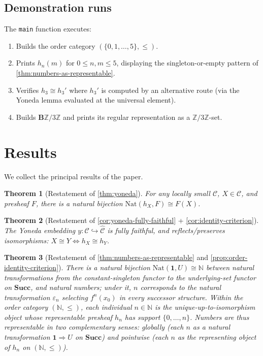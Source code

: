 \documentclass[12pt]{article}
\newtheorem{theorem}{Theorem}[section]
\theoremstyle{definition}
\theoremstyle{remark}
\begin{document}
\subsection{Demonstration runs}

The \texttt{main} function executes:
\begin{enumerate}
\item Builds the order category $(\{0, 1, \ldots, 5\}, \le)$.
\item Prints $h_n(m)$ for $0 \le n, m \le 5$, displaying the singleton-or-empty pattern of \cref{thm:numbers-as-representable}.
\item Verifies $h_3 \cong h_3'$ where $h_3'$ is computed by an alternative route (via the Yoneda lemma evaluated at the universal element).
\item Builds $\mathbf{B}\mathbb{Z}/3\mathbb{Z}$ and prints its regular representation as a $\mathbb{Z}/3\mathbb{Z}$-set.
\end{enumerate}

\section{Results}
\label{sec:results}

We collect the principal results of the paper.

\begin{theorem}[Restatement of \cref{thm:yoneda}]
For any locally small $\mathcal{C}$, $X \in \mathcal{C}$, and presheaf $F$, there is a natural bijection $\mathrm{Nat}(h_X, F) \cong F(X)$.
\end{theorem}

\begin{theorem}[Restatement of \cref{cor:yoneda-fully-faithful} + \cref{cor:identity-criterion}]
The Yoneda embedding $y\colon \mathcal{C} \hookrightarrow \widehat{\mathcal{C}}$ is fully faithful, and reflects/preserves isomorphisms: $X \cong Y \iff h_X \cong h_Y$.
\end{theorem}

\begin{theorem}[Restatement of \cref{thm:numbers-as-representable} and \cref{prop:order-identity-criterion}]
There is a natural bijection $\mathrm{Nat}(\mathbf{1}, U) \cong \mathbb{N}$ between natural transformations from the constant-singleton functor to the underlying-set functor on $\mathbf{Succ}$, and natural numbers; under it, $n$ corresponds to the natural transformation $\varepsilon_n$ selecting $f^n(x_0)$ in every successor structure. Within the order category $(\mathbb{N}, \le)$, each individual $n \in \mathbb{N}$ is the unique-up-to-isomorphism object whose representable presheaf $h_n$ has support $\{0, \ldots, n\}$. Numbers are thus representable in two complementary senses: globally (each $n$ as a natural transformation $\mathbf{1} \Rightarrow U$ on $\mathbf{Succ}$) and pointwise (each $n$ as the representing object of $h_n$ on $(\mathbb{N}, \le)$).
\end{theorem}
\end{document}
